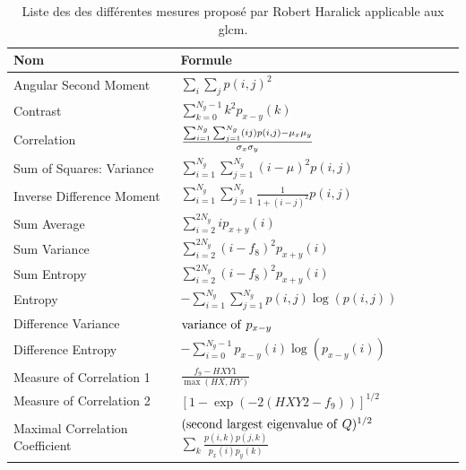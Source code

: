 \begin{table}[H]
    \centering
    \begin{tabular}{ll}
        \hline
        \textbf{Nom}                & \textbf{Formule}                                                                              \\ \hline
        Angular Second Moment       & $ \sum_i\sum_jp(i,j)^2$                                                                       \\
        Contrast                    & $\sum_{k=0}^{N_g-1} k^2 p_{x-y}(k)$                                                           \\
        Correlation                 & $\frac{\Large{\sum_{i=1}^{N_g}\sum_{j=1}^{N_g}} (ij)p(i,j) - \mu_x\mu_y}{\sigma_x\sigma_y}$   \\
        Sum of Squares: Variance    & $\sum_{i=1}^{N_g}\sum_{j=1}^{N_g} (i - \mu)^2 p(i,j)$                                         \\
        Inverse Difference Moment   & $\sum_{i=1}^{N_g}\sum_{j=1}^{N_g} \frac{1}{1 + (i - j)^2} p(i,j)$                             \\     
        Sum Average                 & $\sum_{i=2}^{2N_g} i p_{x+y}(i)$                                                              \\    
        Sum Variance                & $\sum_{i=2}^{2N_g} (i - f_8)^2 p_{x+y}(i)$                                                    \\    
        Sum Entropy                 & $\sum_{i=2}^{2N_g} (i - f_8)^2 p_{x+y}(i)$                                                    \\    
        Entropy                     & $-\sum_{i=1}^{N_g}\sum_{j=1}^{N_g} p(i,j) \log(p(i,j))$                                       \\    
        Difference Variance         & ${\rm variance \ of ~} p_{x-y}$                                                               \\    
        Difference Entropy          & $-\sum_{i=0}^{N_g-1} p_{x-y}(i) \log(p_{x-y}(i))$                                             \\
        Measure of Correlation 1    & $\frac{f_9 - HXY1}{\max(HX,HY)}$                                                              \\  
        Measure of Correlation 2    & $[1 - \exp(-2(HXY2 - f_9))]^{1/2}$                                                            \\ 
        Maximal Correlation Coefficient    & $({\rm second \ largest \ eigenvalue \ of ~} Q)^{1/2}$ $\sum_k \frac{p(i,k)p(j,k)}{p_x(i)p_y(k)}$ \\ 
    \end{tabular}
    \caption{Liste des des différentes mesures proposé par Robert Haralick applicable aux \gls{glcm}.}
    \label{tab:haralick_descriptors}
\end{table}\par
 

